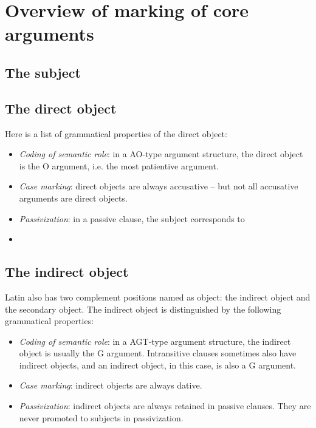 \documentclass[UTF8, a4paper, oneside]{report}
\begin{document}
\section{Overview of marking of core arguments}\label{sec:core-argument-marking}

\subsection{The subject}

\subsection{The direct object}

Here is a list of grammatical properties of the direct object:
\begin{itemize}
    \item \emph{Coding of semantic role}: in a AO-type argument structure, 
    the direct object is the O argument, i.e. the most patientive argument. 

    \item \emph{Case marking}: direct objects are always accusative -- 
    but not all accusative arguments are direct objects.
    \item \emph{Passivization}: in a passive clause, the subject corresponds to 
    \item %
\end{itemize}

\subsection{The indirect object}

Latin also has two complement positions named as object:
the indirect object and the secondary object.
The indirect object is distinguished by the following grammatical properties:
\begin{itemize}
    \item \emph{Coding of semantic role}: in a AGT-type argument structure, 
    the indirect object is usually the G argument.
    Intransitive clauses sometimes also have indirect objects, 
    and an indirect object, in this case, is also a G argument.
    \item \emph{Case marking}: indirect objects are always dative.
    \item \emph{Passivization}: indirect objects are always retained in passive clauses. 
    They are never promoted to subjects in passivization.
\end{itemize}
\end{document}
